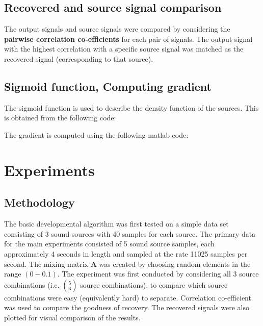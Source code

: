 \documentclass[11pt]{article}
\begin{document}
\subsection{Recovered and source signal comparison}
The output signals and source signals were compared by considering the \textbf{pairwise correlation co-efficients} for each pair of signals. 
The output signal with the highest correlation with a specific source signal was matched as the recovered signal (corresponding to that source).

\subsection{Sigmoid function, Computing gradient}

The sigmoid function is used to describe the density function of the sources. This is obtained from the following code:



The gradient is computed using the following matlab code:



\section{Experiments}
\subsection{Methodology}
The basic developmental algorithm was first tested on a simple data set consisting of 3 sound sources with 40 samples for each source. 
The primary data for the main experiments consisted of 5 sound source samples, each approximately 4 seconds in length and sampled at the rate 11025 samples per second. The mixing matrix \textbf{A} was created by choosing random elements in the range $(0 - 0.1)$. The experiment was first conducted by considering all 3 source combinations (i.e. $5 \choose 3$ source combinations), to compare which source combinations were easy (equivalently hard) to separate. Correlation co-efficient was used to compare the goodness of recovery. The recovered signals were also plotted for visual comparison of the results.
\end{document}
